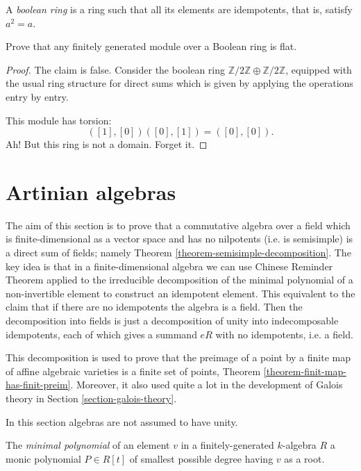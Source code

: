 \begin{definition}
\label{definition-boolean-ring}
A {\it boolean ring} is a ring such
that all its elements are idempotents,
that is, satisfy $a^2=a$.
\end{definition}

\begin{exercise}
\label{exercise-boolean-ring-flat}
Prove that any finitely generated module
over a Boolean ring is flat.
\end{exercise}

\begin{proof}
The claim is false.
Consider the boolean ring
$\mathbb{Z}/2\mathbb{Z} \oplus
\mathbb{Z}/2\mathbb{Z}$,
equipped with the usual ring structure
for direct sums which is given
by applying the operations entry by entry.

This module has torsion:
$$
([1],[0])([0],[1])=([0],[0]).
$$
Ah! But this ring is not a domain. Forget it.
\end{proof}

\section{Artinian algebras}
\label{section-artinian-algebras}

\noindent
The aim of this section
is to prove that a commutative
algebra over a field
which is finite-dimensional as a
vector space and has no nilpotents
(i.e. is semisimple)
is a direct sum of fields;
namely Theorem
\ref{theorem-semisimple-decomposition}.
The key idea is that in a
finite-dimensional algebra
we can use Chinese Reminder Theorem
applied to the irreducible
decomposition of the minimal
polynomial of a non-invertible
element to construct an idempotent
element.
This equivalent to the claim that
if there are no idempotents
the algebra is a field.
Then the decomposition into fields
is just a decomposition
of unity into indecomposable
idempotents, each of which
gives a summand $eR$ with no
idempotents, i.e. a field.

This decomposition is used to prove
that the preimage of a point by a
finite map of
affine algebraic varieties
is a finite set of points,
Theorem
\ref{theorem-finit-map-has-finit-preim}.
Moreover, it also used quite a lot in the
development of Galois theory in
Section \ref{section-galois-theory}.


\medskip\noindent
In this section algebras are not
assumed to have unity.

\begin{definition}
\label{definition-minimal-polynomial}
The {\it minimal polynomial} of an element
$v$
in a finitely-generated $k$-algebra $R$
a monic polynomial $P \in R[t]$
of smallest possible degree having $v$ as a
root.
\end{definition}

